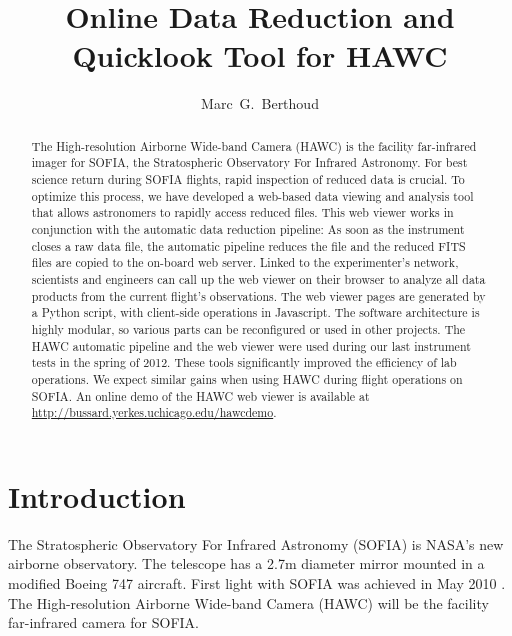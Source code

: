 
\resetcounters




\title{Online Data Reduction and Quicklook Tool for HAWC}
\author{Marc~G.~Berthoud
}


\begin{abstract}
The High-resolution Airborne Wide-band Camera (HAWC) is the facility far-infrared imager for SOFIA, the Stratospheric Observatory For Infrared Astronomy.  For best science return during SOFIA flights, rapid inspection of reduced data is crucial. To optimize this process, we have developed a web-based data viewing and analysis tool that allows astronomers to rapidly access reduced files.  This web viewer works in conjunction with the automatic data reduction pipeline: As soon as the instrument closes a raw data file, the automatic pipeline reduces the file and the reduced FITS files are copied to the on-board web server. Linked to the experimenter's network, scientists and engineers can call up the web viewer on their browser to analyze all data products from the current flight's observations.  The web viewer pages are generated by a Python script, with client-side operations in Javascript. The software architecture is highly modular, so various parts can be reconfigured or used in other projects.  The HAWC automatic pipeline and the web viewer were used during our last instrument tests in the spring of 2012. These tools significantly improved the efficiency of lab operations. We expect similar gains when using HAWC during flight operations on SOFIA. An online demo of the HAWC web viewer is available at \url{http://bussard.yerkes.uchicago.edu/hawcdemo}.\end{abstract}

\section{Introduction}

The Stratospheric Observatory For Infrared Astronomy (SOFIA) is NASA's new airborne observatory. The telescope has a 2.7m diameter mirror mounted in a modified Boeing 747 aircraft. First light with SOFIA was achieved in May 2010 \citep{herter12}. The High-resolution Airborne Wide-band Camera (HAWC) will be the facility far-infrared camera for SOFIA.

